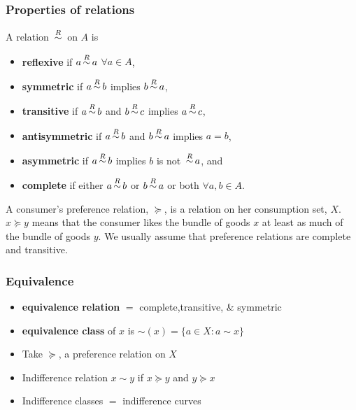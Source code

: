 \documentclass[compress]{beamer}
\def\pref{\succeq}
\def\rel{\,{\buildrel R \over \sim}\,}
\begin{document}
\begin{frame}\frametitle{Properties of relations}
  A relation $\rel$ on $A$ is 
  \begin{itemize}
  \item \textbf{reflexive} if $a \rel a$ $\forall a \in A$,
  \item \textbf{symmetric} if $a \rel b$ implies $b \rel a$,
  \item \textbf{transitive} if $a \rel b$ and $b \rel c$ implies
    $a \rel c$,
  \item \textbf{antisymmetric} if $a \rel b$ and $b \rel a$
    implies $a=b$,
  \item \textbf{asymmetric} if $a \rel b$ implies $b$ is not
    $\rel a$, and
  \item \textbf{complete} if either $a \rel b$ or $b \rel a$ or
    both $\forall a, b \in A$. 
  \end{itemize}
\end{frame}

\begin{frame}
\begin{example} 
  A consumer's preference relation, $\pref$, is a relation on her
  consumption set, $X$. $x \pref y$ means that the consumer likes the
  bundle of goods $x$ at least as much of the bundle of goods $y$. We
  usually assume that preference relations are complete and
  transitive.
\end{example}
\end{frame}

\begin{frame}[shrink]
  \frametitle{Equivalence}
  \begin{itemize}
  \item \textbf{equivalence relation} $=$ complete,transitive, \&
    symmetric
  \item \textbf{equivalence class} of $x$ is $\sim(x) = \{ a
    \in X: a \sim x \}$
  \end{itemize}
  \begin{example}[Indifference]
    \begin{itemize}
    \item Take $\pref$, a preference relation on $X$
    \item  Indifference relation $x \sim y$ if $x \pref y$ and $y
      \pref x$
    \item Indifference classes $=$ indifference curves
    \end{itemize}
  \end{example}
\end{frame}
\end{document}
